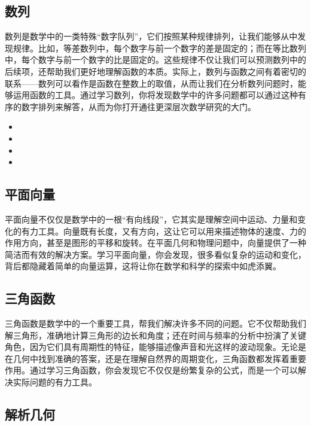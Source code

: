 \subsection{数列}

数列是数学中的一类特殊“数字队列”，它们按照某种规律排列，让我们能够从中发现规律。比如，等差数列中，每个数字与前一个数字的差是固定的；而在等比数列中，每个数字与前一个数字的比是固定的。这些规律不仅让我们可以预测数列中的后续项，还帮助我们更好地理解函数的本质。实际上，数列与函数之间有着密切的联系——数列可以看作是函数在整数上的取值，从而让我们在分析数列问题时，能够运用函数的工具。通过学习数列，你将发现数学中的许多问题都可以通过这种有序的数字排列来解答，从而为你打开通往更深层次数学研究的大门。
\begin{itemize}
\item {}
\item {}
\item {}
\item {}
\end{itemize}
\subsection{平面向量}

平面向量不仅仅是数学中的一根“有向线段”，它其实是理解空间中运动、力量和变化的有力工具。向量既有长度，又有方向，这让它可以用来描述物体的速度、力的作用方向，甚至是图形的平移和旋转。在平面几何和物理问题中，向量提供了一种简洁而有效的解决方案。学习平面向量，你会发现，很多看似复杂的运动和变化，背后都隐藏着简单的向量运算，这将让你在数学和科学的探索中如虎添翼。

\subsection{三角函数}

三角函数是数学中的一个重要工具，帮我们解决许多不同的问题。它不仅帮助我们解三角形，准确地计算三角形的边长和角度；还在时间与频率的分析中扮演了关键角色，因为它们具有周期性的特征，能够描述像声音和光这样的波动现象。无论是在几何中找到准确的答案，还是在理解自然界的周期变化，三角函数都发挥着重要作用。通过学习三角函数，你会发现它不仅仅是纷繁复杂的公式，而是一个可以解决实际问题的有力工具。

\subsection{解析几何}

